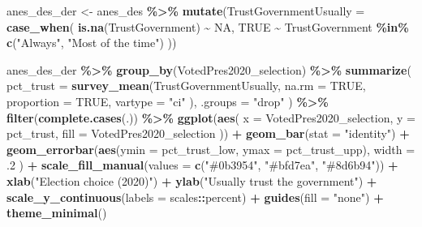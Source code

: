 \documentclass[
]{krantz}
\makeatletter
\newenvironment{Shaded}{\begin{snugshade}}{\end{snugshade}}
\newcommand{\AttributeTok}[1]{\textcolor[rgb]{0.27,0.27,0.27}{#1}}
\newcommand{\ConstantTok}[1]{\textcolor[rgb]{0.37,0.37,0.37}{#1}}
\newcommand{\DecValTok}[1]{\textcolor[rgb]{0.06,0.06,0.06}{#1}}
\newcommand{\FunctionTok}[1]{\textcolor[rgb]{0.27,0.27,0.27}{\textbf{#1}}}
\newcommand{\NormalTok}[1]{#1}
\newcommand{\OtherTok}[1]{\textcolor[rgb]{0.37,0.37,0.37}{#1}}
\newcommand{\SpecialCharTok}[1]{\textcolor[rgb]{0.43,0.43,0.43}{\textbf{#1}}}
\newcommand{\StringTok}[1]{\textcolor[rgb]{0.5,0.5,0.5}{#1}}
\newenvironment{kframe}{%
\medskip{}
\setlength{\fboxsep}{.8em}
 \def\at@end@of@kframe{}%
 \ifinner\ifhmode%
  \def\at@end@of@kframe{\end{minipage}}%
  \begin{minipage}{\columnwidth}%
 \fi\fi%
 \def\FrameCommand##1{\hskip\@totalleftmargin \hskip-\fboxsep
 \colorbox{shadecolor}{##1}\hskip-\fboxsep
     \hskip-\linewidth \hskip-\@totalleftmargin \hskip\columnwidth}%
 \MakeFramed {\advance\hsize-\width
   \@totalleftmargin\z@ \linewidth\hsize
   \@setminipage}}%
 {\par\unskip\endMakeFramed%
 \at@end@of@kframe}
\renewenvironment{Shaded}{\begin{kframe}}{\end{kframe}}
\makeatother
\begin{document}
\begin{Shaded}
\begin{Highlighting}[]
\NormalTok{anes\_des\_der }\OtherTok{\textless{}{-}}\NormalTok{ anes\_des }\SpecialCharTok{\%\textgreater{}\%}
  \FunctionTok{mutate}\NormalTok{(}\AttributeTok{TrustGovernmentUsually =} \FunctionTok{case\_when}\NormalTok{(}
    \FunctionTok{is.na}\NormalTok{(TrustGovernment) }\SpecialCharTok{\textasciitilde{}} \ConstantTok{NA}\NormalTok{,}
    \ConstantTok{TRUE} \SpecialCharTok{\textasciitilde{}}\NormalTok{ TrustGovernment }\SpecialCharTok{\%in\%} \FunctionTok{c}\NormalTok{(}\StringTok{"Always"}\NormalTok{, }\StringTok{"Most of the time"}\NormalTok{)}
\NormalTok{  ))}

\NormalTok{anes\_des\_der }\SpecialCharTok{\%\textgreater{}\%}
  \FunctionTok{group\_by}\NormalTok{(VotedPres2020\_selection) }\SpecialCharTok{\%\textgreater{}\%}
  \FunctionTok{summarize}\NormalTok{(}
    \AttributeTok{pct\_trust =} \FunctionTok{survey\_mean}\NormalTok{(TrustGovernmentUsually,}
      \AttributeTok{na.rm =} \ConstantTok{TRUE}\NormalTok{,}
      \AttributeTok{proportion =} \ConstantTok{TRUE}\NormalTok{,}
      \AttributeTok{vartype =} \StringTok{"ci"}
\NormalTok{    ),}
    \AttributeTok{.groups =} \StringTok{"drop"}
\NormalTok{  ) }\SpecialCharTok{\%\textgreater{}\%}
  \FunctionTok{filter}\NormalTok{(}\FunctionTok{complete.cases}\NormalTok{(.)) }\SpecialCharTok{\%\textgreater{}\%}
  \FunctionTok{ggplot}\NormalTok{(}\FunctionTok{aes}\NormalTok{(}
    \AttributeTok{x =}\NormalTok{ VotedPres2020\_selection, }\AttributeTok{y =}\NormalTok{ pct\_trust,}
    \AttributeTok{fill =}\NormalTok{ VotedPres2020\_selection}
\NormalTok{  )) }\SpecialCharTok{+}
  \FunctionTok{geom\_bar}\NormalTok{(}\AttributeTok{stat =} \StringTok{"identity"}\NormalTok{) }\SpecialCharTok{+}
  \FunctionTok{geom\_errorbar}\NormalTok{(}\FunctionTok{aes}\NormalTok{(}\AttributeTok{ymin =}\NormalTok{ pct\_trust\_low, }\AttributeTok{ymax =}\NormalTok{ pct\_trust\_upp),}
    \AttributeTok{width =}\NormalTok{ .}\DecValTok{2}
\NormalTok{  ) }\SpecialCharTok{+}
  \FunctionTok{scale\_fill\_manual}\NormalTok{(}\AttributeTok{values =} \FunctionTok{c}\NormalTok{(}\StringTok{"\#0b3954"}\NormalTok{, }\StringTok{"\#bfd7ea"}\NormalTok{, }\StringTok{"\#8d6b94"}\NormalTok{)) }\SpecialCharTok{+}
  \FunctionTok{xlab}\NormalTok{(}\StringTok{"Election choice (2020)"}\NormalTok{) }\SpecialCharTok{+}
  \FunctionTok{ylab}\NormalTok{(}\StringTok{"Usually trust the government"}\NormalTok{) }\SpecialCharTok{+}
  \FunctionTok{scale\_y\_continuous}\NormalTok{(}\AttributeTok{labels =}\NormalTok{ scales}\SpecialCharTok{::}\NormalTok{percent) }\SpecialCharTok{+}
  \FunctionTok{guides}\NormalTok{(}\AttributeTok{fill =} \StringTok{"none"}\NormalTok{) }\SpecialCharTok{+}
  \FunctionTok{theme\_minimal}\NormalTok{()}
\end{Highlighting}
\end{Shaded}
\end{document}

